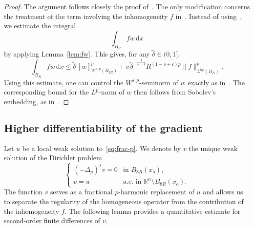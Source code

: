 \documentclass[10pt,letterpaper]{amsart}
\theoremstyle{definition}
\numberwithin{theorem}{section}
\numberwithin{equation}{section}
\newcommand{\1}{\ensuremath{\mathds{1}}}
\renewcommand{\epsilon}{\varepsilon}
\renewcommand{\epsilon}{\varepsilon}
\numberwithin{equation}{section}
\begin{document}
\begin{proof}
The argument follows closely the proof of~\cite[Lemma~3.2]{BDLM}. The only modification concerns the treatment of the term involving the inhomogeneity $f$ in~\cite[(3.4)]{BDLM}. 
Instead of using~\cite[(3.6)]{BDLM}, we estimate the integral
\[
\int_{B_R} f w \,\mathrm{d}x
\] 
by applying Lemma~\ref{lem:fw}. This gives, for any $\tilde\delta \in (0,1]$,
\[
\int_{B_R} f w \,\mathrm{d}x
\le
\tilde\delta \,[w]_{W^{s,p}(B_{2R})}^p
+ c\,\tilde\delta^{-\frac{1}{p-1}} R^{(1-s+\epsilon)p} \|f\|_{L^{\tilde\alpha p}(B_R)}^{p'}.
\]
Using this estimate, one can control the $W^{s,p}$-seminorm of $w$ exactly as in~\cite[Lemma~3.2]{BDLM}. The corresponding bound for the $L^p$-norm of $w$ then follows from Sobolev's embedding, as in~\cite[Corollary~3.3]{BDLM}.
\end{proof}








\subsection{Higher differentiability of the gradient}
Let $u$ be a local weak solution to~\eqref{eq:frac-p}.
We denote by $v$ the unique weak solution of the Dirichlet problem
\begin{equation}\label{CD-v}
\left\{
    \begin{array}{cl}
      (-\Delta_p)^s v = 0 & \text{in } B_{8R}(x_o), \\[6pt]
      v = u & \text{a.e.\ in } \mathbb{R}^n\setminus B_{8R}(x_o).
    \end{array}
\right.
\end{equation}
The function $v$ serves as a fractional $p$-harmonic replacement of $u$ and allows us to
separate the regularity of the homogeneous operator from the
contribution of the inhomogeneity $f$.
The following lemma provides a quantitative estimate for second-order
finite differences of $v$.
\end{document}
